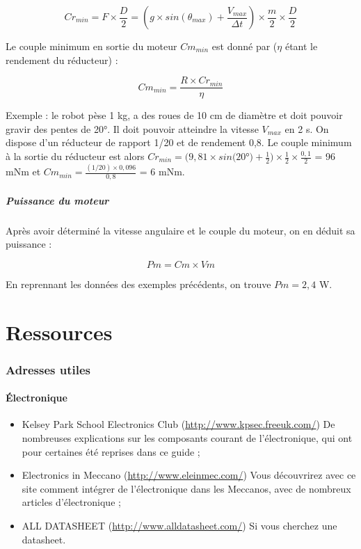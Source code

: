 \documentclass[a4paper]{article}
\begin{document}
\[Cr_{min} = F \times \frac{D}{2} = (g \times sin(\theta{}_{max}) + \frac{V_{max}}{\Delta t}) \times \frac{m}{2} \times \frac{D}{2}\]

Le couple minimum en sortie du moteur $Cm_{min}$ est donné par ($\eta$ étant le rendement du réducteur) :

\[Cm_{min} = \frac{R \times Cr_{min}}{\eta}\]

Exemple : le robot pèse 1 kg, a des roues de 10 cm de diamètre et doit pouvoir gravir des pentes de 20°. Il doit pouvoir atteindre la vitesse $V_{max}$ en 2 s. On dispose d'un réducteur de rapport 1/20\ieme{} et de rendement 0,8.
Le couple minimum à la sortie du réducteur est alors $Cr_{min} = (9,81 \times sin(20$°$) + \frac{1}{2}) \times \frac{1}{2} \times \frac{0,1}{2}$ = 96 mNm et $Cm_{min} = \frac{(1/20) \times 0,096}{0,8}$ = 6 mNm.

\subsubsection{Puissance du moteur}

Après avoir déterminé la vitesse angulaire et le couple du moteur, on en déduit sa puissance :

\[Pm = Cm \times Vm\]

En reprennant les données des exemples précédents, on trouve $Pm = 2,4$ W.

\newpage
\part{Ressources}

\section{Adresses utiles}

\subsection{Électronique}

\begin{itemize}
	\item Kelsey Park School Electronics Club (\url{http://www.kpsec.freeuk.com/})
	\subitem De nombreuses explications sur les composants courant de l'électronique, qui ont pour certaines été reprises dans ce guide ;
	\item Electronics in Meccano (\url{http://www.eleinmec.com/})
	\subitem Vous découvrirez avec ce site comment intégrer de l'électronique dans les Meccanos, avec de nombreux articles d'électronique ;
	\item ALL DATASHEET (\url{http://www.alldatasheet.com/})
	\subitem Si vous cherchez une datasheet.
\end{itemize}
\end{document}
